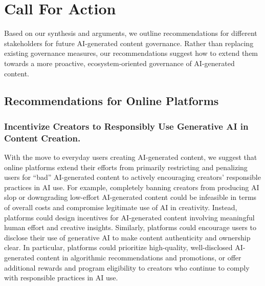 \section{Call For Action}
\label{sec:cfa}


Based on our synthesis and arguments, we outline recommendations for different stakeholders for future AI-generated content governance. Rather than replacing existing governance measures, our recommendations suggest how to extend them towards a more proactive, ecosystem-oriented governance of AI-generated content.

\subsection{Recommendations for Online Platforms}
\subsubsection{Incentivize Creators to Responsibly Use Generative AI in Content Creation.} With the move to everyday users creating AI-generated content, we suggest that online platforms extend their efforts from primarily restricting and penalizing users for ``bad'' AI-generated content to actively encouraging creators' responsible practices in AI use. For example, completely banning creators from producing AI slop or downgrading low-effort AI-generated content could be infeasible in terms of overall costs and compromise legitimate use of AI in creativity. Instead, platforms could design incentives for AI-generated content involving meaningful human effort and creative insights. Similarly, platforms could encourage users to disclose their use of generative AI to make content authenticity and ownership clear. In particular, platforms could prioritize high-quality, well-disclosed AI-generated content in algorithmic recommendations and promotions, or offer additional rewards and program eligibility to creators who continue to comply with responsible practices in AI use.

